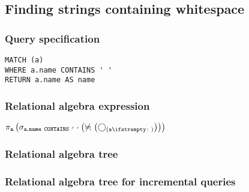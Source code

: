 \subsection{Finding strings containing whitespace}

\subsubsection*{Query specification}

\begin{lstlisting}
MATCH (a)
WHERE a.name CONTAINS ' '
RETURN a.name AS name
\end{lstlisting}

\subsubsection*{Relational algebra expression}

$\projection{\var{a}} \left(\selection{\mathtt{a.name~CONTAINS~'~'}} \left(\alldifferent{} \left(\getvertices{a}{}\right)\right)\right)$

\subsubsection*{Relational algebra tree}


\subsubsection*{Relational algebra tree for incremental queries}


